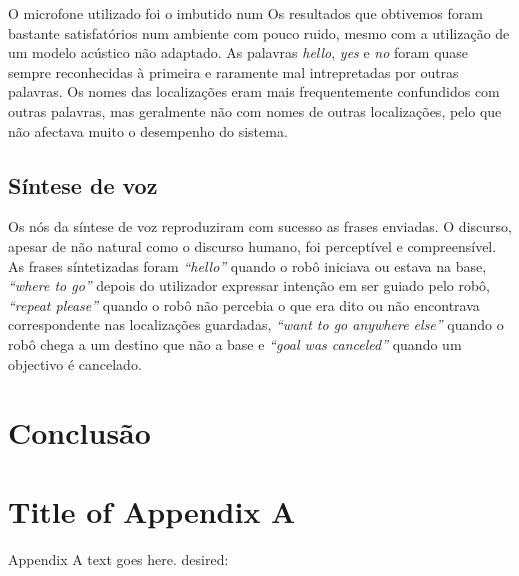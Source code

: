 \documentclass[journal]{IEEEtran}
\begin{document}
O microfone utilizado foi o imbutido num Os resultados que obtivemos foram bastante satisfatórios num ambiente com pouco ruido, mesmo com a utilização de um modelo acústico não adaptado. As palavras \textit{hello}, \textit{yes} e \textit{no} foram quase sempre reconhecidas à primeira e raramente mal intrepretadas por outras palavras. Os nomes das localizações eram mais frequentemente confundidos com outras palavras, mas geralmente não com nomes de outras localizações, pelo que não afectava muito o desempenho do sistema.

\subsection{Síntese de voz}
\label{sec:results_sintvoice}

Os nós da síntese de voz reproduziram com sucesso as frases enviadas. O discurso, apesar de não natural como o discurso humano, foi perceptível e compreensível. As frases síntetizadas foram \textit{``hello''} quando o robô iniciava ou estava na base, \textit{``where to go''} depois do utilizador expressar intenção em ser guiado pelo robô, \textit{``repeat please''} quando o robô não percebia o que era dito ou não encontrava correspondente nas localizações guardadas, \textit{``want to go anywhere else''} quando o robô chega a um destino que não a base e \textit{``goal was canceled''} quando um objectivo é cancelado.

\section{Conclusão}


\appendices
\section{Title of Appendix A}
Appendix A text goes here.
desired:

\end{document}
